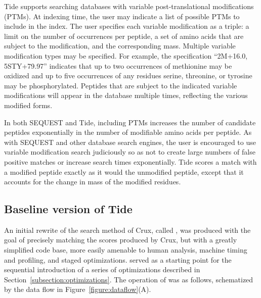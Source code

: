 
Tide supports searching databases with variable post-translational
modifications (PTMs). At indexing time, the user may indicate a list
of possible PTMs to include in the index. The user specifies each
variable modification as a triple: a limit on the number of
occurrences per peptide, a set of amino acids that are subject to the
modification, and the corresponding mass.  Multiple variable
modification types may be specified. For example, the specification
``2M+16.0, 5STY+79.97'' indicates that up to two occurrences of
methionine may be oxidized and up to five occurrences of any residues
serine, threonine, or tyrosine may be phosphorylated. Peptides that
are subject to the indicated variable modifications will appear in the
database multiple times, reflecting the various modified forms.

In both SEQUEST and Tide, including PTMs increases the number of
candidate peptides exponentially in the number of modifiable amino
acids per peptide.  As with SEQUEST and other database search engines,
the user is encouraged to use variable modification search judiciously
so as not to create large numbers of false positive matches or
increase search times exponentially. Tide scores a match with a
modified peptide exactly as it would the unmodified peptide, except
that it accounts for the change in mass of the modified residues.

\subsection{Baseline version of Tide \DIFaddbegin \label{subsection:tidezero}\DIFaddend }

An initial rewrite of the search method of Crux, called \tidezero, was
produced with the goal of precisely matching the \XCorr scores
produced by Crux, but with a greatly simplified code base, more easily
amenable to human analysis, machine timing and profiling, and staged
optimizations.  \tidezero served as a starting point for the
sequential introduction of a series of optimizations described in
Section~\ref{subsection:optimizations}. The operation of \tidezero was as
follows, schematized by the data flow in Figure~\ref{figure:dataflow}(A).

